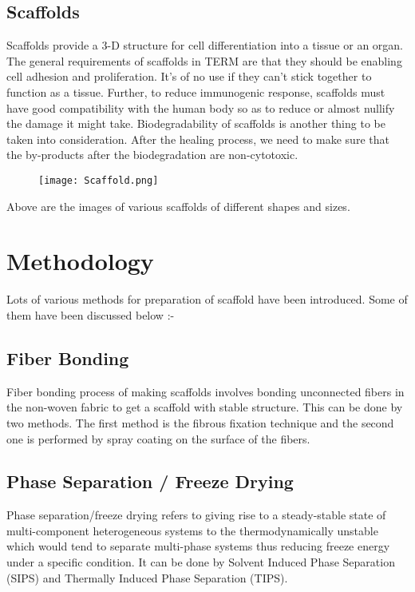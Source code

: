 \documentclass[12pt]{article}
\begin{document}
\subsection{Scaffolds}
\bigskip
\bigskip
Scaffolds provide a 3-D structure for cell differentiation into a tissue or an organ. The general requirements of scaffolds in TERM are that they should be enabling cell adhesion and proliferation. It's of no use if they can't stick together to function as a tissue. Further, to reduce immunogenic response, scaffolds must have good compatibility with the human body so as to reduce or almost nullify the damage it might take. Biodegradability of scaffolds is another thing to be taken into consideration. After the healing process, we need to make sure that the by-products after the biodegradation are non-cytotoxic.
\linebreak
\linebreak
\begin{figure}[h]
\centering
\texttt{[image: Scaffold.png]}
\end{figure}
\linebreak
Above are the images of various scaffolds of different shapes and sizes.
\clearpage

\centering
\section{Methodology}
\raggedright
Lots of various methods for preparation of scaffold have been introduced. Some of them have been discussed below :-

\subsection{Fiber Bonding}
Fiber bonding process of making scaffolds involves bonding unconnected fibers in the non-woven fabric to get a scaffold with stable structure. This can be done by two methods. The first method is the fibrous fixation technique and the second one is performed by spray coating on the surface of the fibers.

\subsection{Phase Separation / Freeze Drying}
Phase separation/freeze drying refers to giving rise to a steady-stable state of multi-component heterogeneous systems to the thermodynamically unstable which would tend to separate multi-phase systems thus reducing freeze energy under a specific condition. It can be done by Solvent Induced Phase Separation (SIPS) and Thermally Induced Phase Separation (TIPS).
\end{document}

